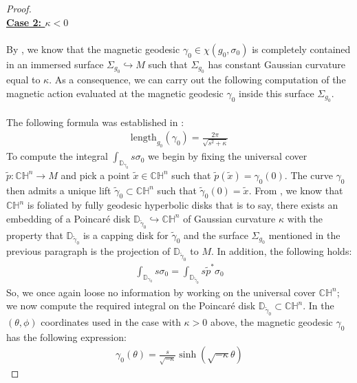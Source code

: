 \documentclass[11pt]{amsart}
\theoremstyle{plain}
\theoremstyle{definition}
\theoremstyle{remark}
\begin{document}
\begin{proof}
\\
\textbf{\underline{Case 2: $\kappa <0$}}\\
\\
By \cite{johanna_negative_curvature}, we know that the magnetic geodesic $\gamma_0 \in \chi(g_0,\sigma_0)$ is completely contained in an immersed surface $\Sigma_{g_0} \hookrightarrow M$ such that $\Sigma_{g_0}$ has constant Gaussian curvature equal to $\kappa$. As a consequence, we can carry out the following computation of the magnetic action evaluated at the magnetic geodesic $\gamma_0$ inside this surface $\Sigma_{g_0}$.\\
\\
The following formula was established in \cite{johanna_negative_curvature}:
\begin{align}\label{length_hyperbolic}
    \text{length}_{g_0}(\gamma_{0}) = \frac{2\pi}{\sqrt{s^2+ \kappa }}
\end{align}
To compute the integral $\int_{\mathbb{D}_{\gamma_0}} s\sigma_0$ we begin by fixing the universal cover $\tilde p: \mathbb{CH}^n \rightarrow M$ and pick a point $\tilde x \in \mathbb{CH}^n$ such that $\tilde p(\tilde x) = \gamma_0(0)$. The curve $\gamma_0$ then admits a unique lift $\tilde \gamma_0 \subset \mathbb{CH}^n$ such that $\tilde \gamma_0(0)=\tilde x$. From \cite{johanna_negative_curvature}, we know that $\mathbb{CH}^n$ is foliated by fully geodesic hyperbolic disks that is to say, there exists an embedding of a Poincar\'e disk  $\mathbb{D}_{\tilde \gamma_0} \hookrightarrow \mathbb{CH}^n$ of Gaussian curvature $\kappa$ with the property that $\mathbb{D}_{\tilde \gamma_0}$ is a capping disk for $\tilde \gamma_0$ and the surface $\Sigma_{g_0}$ mentioned in the previous paragraph is the projection of $\mathbb{D}_{\tilde \gamma_0}$ to $M$. In addition, the following holds:
\begin{align}
    \int_{\mathbb{D}_{\gamma_0}} s\sigma_{\text{0}} =\int_{\mathbb{D}_{\tilde \gamma_0}} s\tilde p^*\sigma_{\text{0}}
\end{align}
So, we once again loose no information by working on the universal cover $\mathbb{CH}^n$; we now compute the required integral on the Poincar\'e disk $\mathbb{D}_{\tilde \gamma_0} \subset \mathbb{CH}^n$. In the $(\theta, \phi)$ coordinates used in the case with $\kappa>0$ above, the magnetic geodesic $\gamma_0$ has the following expression:
\begin{align}\label{mag_geodesic_hyp_eqn}
    \gamma_0(\theta) =\frac{s}{\sqrt{-\kappa}} \sinh(\sqrt{-\kappa}\theta) 
\end{align}

\end{proof}
\end{document}
